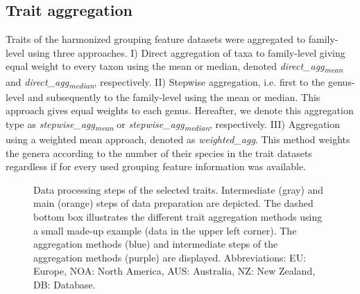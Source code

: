 \documentclass{article}
\begin{document}
\newpage


\subsection*{Trait aggregation}

Traits of the harmonized grouping feature datasets were aggregated to family-level using three approaches. I) Direct aggregation of taxa to family-level giving equal weight to every taxon using the mean or median, denoted \textit{direct\_agg\textsubscript{mean}} and \textit{direct\_agg\textsubscript{median}}, respectively. II) Stepwise aggregation, i.e. first to the genus-level and subsequently to the family-level using the mean or median. This approach gives equal weights to each genus. Hereafter, we denote this aggregation type as \textit{stepwise\_agg\textsubscript{mean}} or \textit{stepwise\_agg\textsubscript{median}}, respectively. III) Aggregation using a weighted mean approach, denoted as \textit{weighted\_agg}. This method weights the genera according to the number of their species in the trait datasets regardless if for every used grouping feature information was available. 

\begin{figure}
  \centering
  
  \caption{Data processing steps of the selected traits. Intermediate (gray) and main (orange) steps of data preparation are depicted. The dashed bottom box illustrates the different trait aggregation methods using a small made-up example (data in the upper left corner). The aggregation methods (blue) and intermediate steps of the aggregation methods (purple) are displayed. Abbreviations: EU: Europe, NOA: North America, AUS: Australia, NZ: New Zealand, DB: Database.}
\end{figure}
\end{document}
